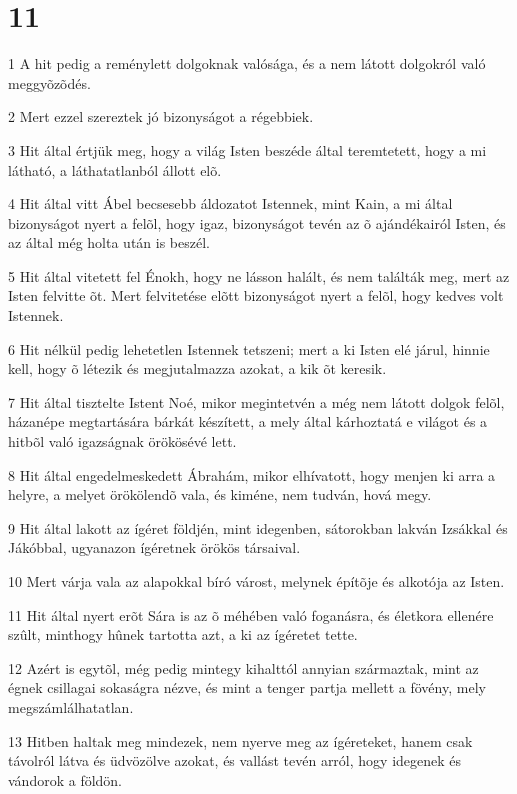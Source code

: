 \chapter{11}

\par 1 A hit pedig a reménylett dolgoknak valósága, és a nem látott dolgokról való meggyõzõdés.
\par 2 Mert ezzel szereztek jó bizonyságot a régebbiek.
\par 3 Hit által értjük meg, hogy a világ Isten beszéde által teremtetett, hogy a mi látható, a láthatatlanból állott elõ.
\par 4 Hit által vitt Ábel becsesebb áldozatot Istennek, mint Kain, a mi által bizonyságot nyert a felõl, hogy igaz, bizonyságot tevén az õ ajándékairól Isten, és az által még holta után is beszél.
\par 5 Hit által vitetett fel Énokh, hogy ne lásson halált, és nem találták meg, mert az Isten felvitte õt. Mert felvitetése elõtt bizonyságot nyert a felõl, hogy kedves volt Istennek.
\par 6 Hit nélkül pedig lehetetlen Istennek tetszeni; mert a ki Isten elé járul, hinnie kell, hogy õ létezik és megjutalmazza azokat, a kik õt keresik.
\par 7 Hit által tisztelte Istent Noé, mikor megintetvén a még nem látott dolgok felõl, házanépe megtartására bárkát készített, a mely által kárhoztatá e világot és a hitbõl való igazságnak örökösévé lett.
\par 8 Hit által engedelmeskedett Ábrahám, mikor elhívatott, hogy menjen ki arra a helyre, a melyet örökölendõ vala, és kiméne, nem tudván, hová megy.
\par 9 Hit által lakott az ígéret földjén, mint idegenben, sátorokban lakván Izsákkal és Jákóbbal, ugyanazon ígéretnek örökös társaival.
\par 10 Mert várja vala az alapokkal bíró várost, melynek építõje és alkotója az Isten.
\par 11 Hit által nyert erõt Sára is az õ méhében való foganásra, és életkora ellenére szûlt, minthogy hûnek tartotta azt, a ki az ígéretet tette.
\par 12 Azért is egytõl, még pedig mintegy kihalttól annyian származtak, mint az égnek csillagai sokaságra nézve, és mint a tenger partja mellett a fövény, mely megszámlálhatatlan.
\par 13 Hitben haltak meg mindezek, nem nyerve meg az ígéreteket, hanem csak távolról látva és üdvözölve azokat, és vallást tevén arról,  hogy idegenek és vándorok a földön.
